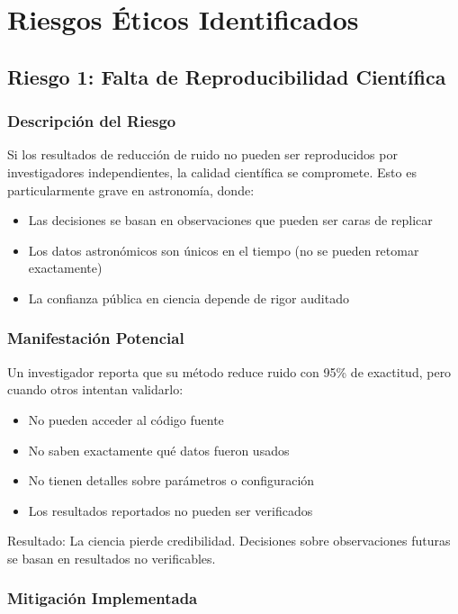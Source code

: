 \section{Riesgos Éticos Identificados}

\subsection{Riesgo 1: Falta de Reproducibilidad Científica}

\subsubsection{Descripción del Riesgo}

Si los resultados de reducción de ruido no pueden ser reproducidos por investigadores independientes, la calidad científica se compromete. Esto es particularmente grave en astronomía, donde:

\begin{itemize}
    \item Las decisiones se basan en observaciones que pueden ser caras de replicar
    \item Los datos astronómicos son únicos en el tiempo (no se pueden retomar exactamente)
    \item La confianza pública en ciencia depende de rigor auditado
\end{itemize}

\subsubsection{Manifestación Potencial}

Un investigador reporta que su método reduce ruido con 95\% de exactitud, pero cuando otros intentan validarlo:
\begin{itemize}
    \item No pueden acceder al código fuente
    \item No saben exactamente qué datos fueron usados
    \item No tienen detalles sobre parámetros o configuración
    \item Los resultados reportados no pueden ser verificados
\end{itemize}

Resultado: La ciencia pierde credibilidad. Decisiones sobre observaciones futuras se basan en resultados no verificables.

\subsubsection{Mitigación Implementada}


